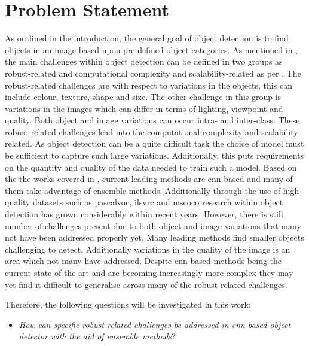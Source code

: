 \section{Problem Statement}
As outlined in the introduction, the general goal of object detection is to find objects in an image based upon pre-defined object categories. As mentioned in , the main challenges within object detection can be defined in two groups as robust-related and computational complexity and scalability-related as per \cite{zhang}. The robust-related challenges are with respect to variations in the objects, this can include colour, texture, shape and size. The other challenge in this group is variations in the images which can differ in terms of lighting, viewpoint and quality. Both object and image variations can occur intra- and inter-class. These robust-related challenges lead into the computational-complexity and scalability-related. As object detection can be a quite difficult task the choice of model must be sufficient to capture such large variations. Additionally, this puts requirements on the quantity and quality of the data needed to train such a model. 
Based on the the works covered in , current leading methods are \gls{cnn}-based and many of them take advantage of ensemble methods. Additionally through the use of high-quality datasets such as \gls{pascalvoc}, \gls{ilsvrc} and \gls{mscoco} research within object detection has grown considerably within recent years. However, there is still number of challenges present due to both object and image variations that many not have been addressed properly yet. Many leading methods find smaller objects challenging to detect. Additionally variations in the quality of the image is an area which not many have addressed.
Despite \gls{cnn}-based methods being the current state-of-the-art and are becoming increasingly more complex they may yet find it difficult to generalise across many of the robust-related challenges.

Therefore, the following questions will be investigated in this work:

\begin{itemize}
\item \textit{How can specific robust-related challenges be addressed in \gls{cnn}-based object detector with the aid of ensemble methods}?
\end{itemize}